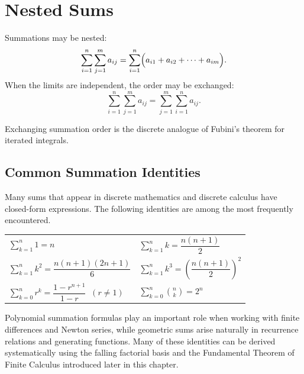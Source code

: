 \section*{Nested Sums}

Summations may be nested:
\[
\sum_{i=1}^{n}\sum_{j=1}^{m} a_{ij}
= \sum_{i=1}^{n} \Bigl(a_{i1}+a_{i2}+\cdots+a_{im}\Bigr).
\]
When the limits are independent, the order may be exchanged:
\[
\sum_{i=1}^{n}\sum_{j=1}^{m} a_{ij}
=
\sum_{j=1}^{m}\sum_{i=1}^{n} a_{ij}.
\]

\begin{remark*}
Exchanging summation order is the discrete analogue of Fubini's theorem
for iterated integrals.
\end{remark*}

\subsection*{Common Summation Identities}
\label{sec:common-summation-identities}

Many sums that appear in discrete mathematics and discrete calculus have
closed-form expressions. The following identities are among the most
frequently encountered.

\begin{tcolorbox}[colback=gray!6, colframe=gray!40, arc=2pt,
  left=6pt, right=6pt, top=4pt, bottom=4pt,
  title={\small\textbf{Common Summation Identities}},
  fonttitle=\small\bfseries]
\renewcommand{\arraystretch}{1.7}
\begin{tabular}{@{}ll@{}}
$\displaystyle\sum_{k=1}^{n} 1 = n$ &
$\displaystyle\sum_{k=1}^{n} k = \dfrac{n(n+1)}{2}$ \\[10pt]
$\displaystyle\sum_{k=1}^{n} k^2 = \dfrac{n(n+1)(2n+1)}{6}$ &
$\displaystyle\sum_{k=1}^{n} k^3 = \left(\dfrac{n(n+1)}{2}\right)^2$ \\[10pt]
$\displaystyle\sum_{k=0}^{n} r^k = \dfrac{1-r^{n+1}}{1-r}\;\;(r\neq 1)$ &
$\displaystyle\sum_{k=0}^{n}\binom{n}{k} = 2^n$
\end{tabular}
\end{tcolorbox}

\begin{remark*}
Polynomial summation formulas play an important role when working with
finite differences and Newton series, while geometric sums arise naturally
in recurrence relations and generating functions. Many of these identities
can be derived systematically using the falling factorial basis and
the Fundamental Theorem of Finite Calculus introduced later in this chapter.
\end{remark*}
